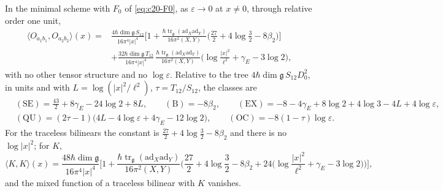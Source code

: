 \begin{theorem}
\label{thm:c20-result}
In the minimal scheme with $F_0$ of \eqref{eq:c20-F0}, as $\varepsilon\to0$ at $x\ne0$, through relative order one unit,
\begin{equation}
\begin{aligned}
\langle O_{a_1b_1},O_{a_2b_2}\rangle(x)={}&\frac{4\hbar\dim\mathfrak g\,S_{12}}{16\pi^4|x|^4}\Big[1+\frac{\hbar\operatorname{tr}_{\mathfrak g}(\mathrm{ad}_X\mathrm{ad}_Y)}{16\pi^2(X,Y)}\Big(\frac{27}2+4\log\frac32-8\beta_2\Big)\Big]\\
&+\frac{32\hbar\dim\mathfrak g\,T_{12}}{16\pi^4|x|^4}\,\frac{\hbar\operatorname{tr}_{\mathfrak g}(\mathrm{ad}_X\mathrm{ad}_Y)}{16\pi^2(X,Y)}\Big(\log\frac{|x|^2}{\ell^2}+\gamma_E-3\log2\Big),
\end{aligned}
\label{eq:c20-result}
\end{equation}
with no other tensor structure and no $\log\varepsilon$. Relative to the tree $4\hbar\dim\mathfrak g\,S_{12}D_0^2$, in units and with $L=\log(|x|^2/\ell^2)$, $\tau=T_{12}/S_{12}$, the classes are
\[
\begin{aligned}
&\mathrm{(SE)}=\tfrac{43}2+8\gamma_E-24\log2+8L,\qquad \mathrm{(B)}=-8\beta_2,\qquad \mathrm{(EX)}=-8-4\gamma_E+8\log2+4\log3-4L+4\log\varepsilon,\\
&\mathrm{(QU)}=(2\tau-1)\big(4L-4\log\varepsilon+4\gamma_E-12\log2\big),\qquad \mathrm{(OC)}=-8(1-\tau)\log\varepsilon .
\end{aligned}
\]
For the traceless bilinears the constant is $\tfrac{27}2+4\log\tfrac32-8\beta_2$ and there is no $\log|x|^2$; for $K$,
\[
\langle K,K\rangle(x)=\frac{48\hbar\dim\mathfrak g}{16\pi^4|x|^4}\Big[1+\frac{\hbar\operatorname{tr}_{\mathfrak g}(\mathrm{ad}_X\mathrm{ad}_Y)}{16\pi^2(X,Y)}\Big(\frac{27}2+4\log\frac32-8\beta_2+24\Big(\log\frac{|x|^2}{\ell^2}+\gamma_E-3\log2\Big)\Big)\Big],
\]
and the mixed function of a traceless bilinear with $K$ vanishes.
\end{theorem}

